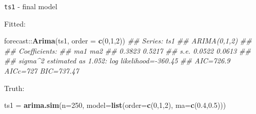 \documentclass[11pt,ignorenonframetext,]{beamer}
\newenvironment{Shaded}{}{}
\newcommand{\CommentTok}[1]{\textcolor[rgb]{0.38,0.63,0.69}{\textit{#1}}}
\newcommand{\DataTypeTok}[1]{\textcolor[rgb]{0.56,0.13,0.00}{#1}}
\newcommand{\DecValTok}[1]{\textcolor[rgb]{0.25,0.63,0.44}{#1}}
\newcommand{\FloatTok}[1]{\textcolor[rgb]{0.25,0.63,0.44}{#1}}
\newcommand{\KeywordTok}[1]{\textcolor[rgb]{0.00,0.44,0.13}{\textbf{#1}}}
\newcommand{\NormalTok}[1]{#1}
\newcommand{\OperatorTok}[1]{\textcolor[rgb]{0.40,0.40,0.40}{#1}}
\newcommand{\StringTok}[1]{\textcolor[rgb]{0.25,0.44,0.63}{#1}}
\let\oldShaded\Shaded
\let\endoldShaded\endShaded
\renewenvironment{Shaded}{\footnotesize\begin{spacing}{0.9}\oldShaded}{\endoldShaded\end{spacing}}
\let\oldverbatim\verbatim
\let\endoldverbatim\endverbatim
\newcommand{\scriptoutput}{
  \renewenvironment{Shaded}{\scriptsize\begin{spacing}{0.9}\oldShaded}{\endoldShaded\end{spacing}}
  \renewenvironment{verbatim}{\scriptsize\begin{spacing}{0.9}\oldverbatim}{\endoldverbatim\end{spacing}}
}
\begin{document}
\begin{frame}[fragile,t]{\texttt{ts1} - final model}
\protect\hypertarget{ts1---final-model}{}

\scriptoutput

Fitted:

\begin{Shaded}
\begin{Highlighting}[]
\NormalTok{forecast}\OperatorTok{::}\KeywordTok{Arima}\NormalTok{(ts1, }\DataTypeTok{order =} \KeywordTok{c}\NormalTok{(}\DecValTok{0}\NormalTok{,}\DecValTok{1}\NormalTok{,}\DecValTok{2}\NormalTok{))}
\CommentTok{## Series: ts1 }
\CommentTok{## ARIMA(0,1,2) }
\CommentTok{## }
\CommentTok{## Coefficients:}
\CommentTok{##          ma1     ma2}
\CommentTok{##       0.3823  0.5217}
\CommentTok{## s.e.  0.0522  0.0613}
\CommentTok{## }
\CommentTok{## sigma^2 estimated as 1.052:  log likelihood=-360.45}
\CommentTok{## AIC=726.9   AICc=727   BIC=737.47}
\end{Highlighting}
\end{Shaded}

Truth:

\begin{Shaded}
\begin{Highlighting}[]
\NormalTok{ts1 =}\StringTok{ }\KeywordTok{arima.sim}\NormalTok{(}\DataTypeTok{n=}\DecValTok{250}\NormalTok{, }\DataTypeTok{model=}\KeywordTok{list}\NormalTok{(}\DataTypeTok{order=}\KeywordTok{c}\NormalTok{(}\DecValTok{0}\NormalTok{,}\DecValTok{1}\NormalTok{,}\DecValTok{2}\NormalTok{), }\DataTypeTok{ma=}\KeywordTok{c}\NormalTok{(}\FloatTok{0.4}\NormalTok{,}\FloatTok{0.5}\NormalTok{))) }
\end{Highlighting}
\end{Shaded}

\end{frame}
\end{document}
